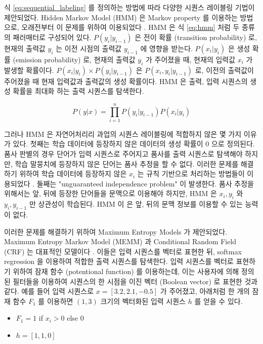 \documentclass[11pt]{article}
\begin{document}
식 \ref{eq:sequential_labeling} 를 정의하는 방법에 따라 다양한 시퀀스 레이블링 기법이 제안되었다.
Hidden Markov Model (HMM) 은 Markov property 를 이용하는 방법으로, 오래전부터 이 문제를 위하여 이용되었다 \citep{krogh1994hidden}.
HMM 은 식 \ref{eq:hmm} 처럼 두 종류의 패러매터로 구성되어 있다.
$P(y_i \vert y_{i-1})$ 은 전이 확률 (transition probability) 로, 현재의 출력값 $y_i$ 는 이전 시점의 출력값 $y_{i-1}$ 에 영향을 받는다.
$P(x_i \vert y_i)$ 은 생성 확률 (emission probability) 로, 현재의 출력값 $y_i$ 가 주어졌을 때, 현재의 입력값 $x_i$ 가 발생할 확률이다.
$P(x_i \vert y_i) \times P(y_i \vert y_{i-1})$ 은 $P(x_i, y_i \vert y_{i-1})$ 로, 이전의 출력값이 주어졌을 때 현재 입력값과 출력값의 생성 확률이다.
HMM 은 출력, 입력 시퀀스의 생성 확률을 최대화 하는 출력 시퀀스를 탐색한다.

\begin{equation}
  \label{eq:hmm}
  P(y \vert x) = \prod_{i=1}^{n} P(y_i \vert y_{i-1}) P(x_i \vert y_i)
\end{equation}

그러나 HMM 은 자연어처리리 과업의 시퀀스 레이블링에 적합하지 않은 몇 가지 이유가 있다.
첫째는 학습 데이터에 등장하지 않은 데이터의 생성 확률이 0 으로 정의된다.
품사 판별의 경우 단어가 입력 시퀀스로 주어지고 품사를 출력 시퀀스로 탐색해야 하지만, 학습 말뭉치에 등장하지 않은 단어는 품사 추정을 할 수 없다.
이러한 문제를 해결하기 위하여 학습 데이터에 등장하지 않은 $x_i$ 는 규칙 기반으로 처리하는 방법들이 이용되었다 \citep{brants2000tnt}.
둘째는 "unguaranteed independence problem" 이 발생한다.
품사 추정을 위해서는 앞, 뒤에 등장한 단어들을 문맥으로 이용해야 하지만, HMM 은 $x_i, y_i$ 와 $y_i, y_{i-1}$ 만 상관성이 학습된다.
HMM 이 은 앞, 뒤의 문맥 정보를 이용할 수 있는 능력이 없다.

이러한 문제를 해결하기 위하여 Maximum Entropy Models 가 제안되었다.
Maximum Entropy Markov Model (MEMM) 과 Conditional Random Field (CRF) 는 대표적인 모델이다 \citep{mccallum2000maximum, lafferty2001conditional}.
이들은 입력 시퀀스를 벡터로 표현한 뒤, softmax regression 을 이용하여 적합한 출력 시퀀스를 탐색한다.
입력 시퀀스를 벡터로 표현하기 위하여 잠재 함수 (potentional function) 를 이용하는데, 이는 사용자에 의해 정의된 필터들을 이용하여 시퀀스의 한 시점을 이진 벡터 (Boolean vector) 로 표현한 것과 같다.
예를 들어 입력 시퀀스로 $x=[3.2, 2.1, -0.5]$ 가 주어졌고, 아래처럼 한 개의 잠재 함수 $F_1$ 를 이용하면 $(1, 3)$ 크기의 벡터화된 입력 시퀀스 $h$ 를 얻을 수 있다.

\begin{itemize}
  \item$F_1 = 1$ if $x_i > 0$ else $0$
  \item$h = [1, 1, 0]$
\end{itemize}
\end{document}
